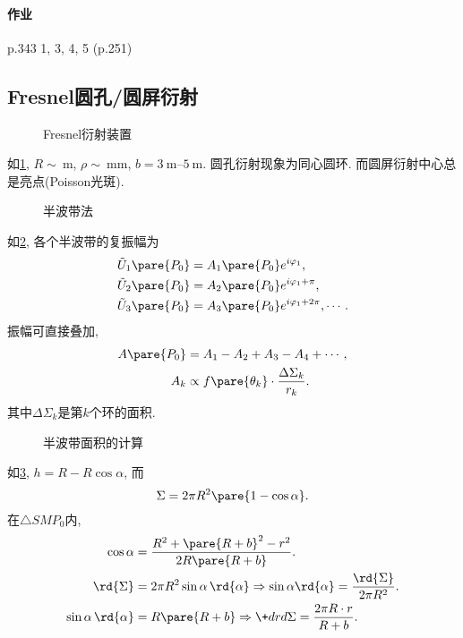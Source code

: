 \documentclass{ctexart}
\begin{document}
\paragraph{作业} %
\label{par:作业}

p.343 1, 3, 4, 5 (p.251)



\subsection{Fresnel圆孔/圆屏衍射} %
\label{sub:fresnel圆孔_圆屏衍射}

\begin{figure}[ht]
    \centering
    \caption{Fresnel衍射装置}
    \label{fig:Fresnel衍射装置}
\end{figure}
如\cref{fig:Fresnel衍射装置}, $R\sim \SI{}{\meter}$, $\rho\sim \SI{}{\milli\meter}$, $b=\SI{3}{\meter}$--$\SI{5}{\meter}$. 圆孔衍射现象为同心圆环. 而圆屏衍射中心总是亮点(Poisson光斑).
\begin{figure}[ht]
    \centering
    \caption{半波带法}
    \label{fig:半波带法}
\end{figure}
如\cref{fig:半波带法}, 各个半波带的复振幅为
\begin{align*}
    \tilde{U}_1\pare{P_0} &= A_1\pare{P_0} e^{i\varphi_1}, \\
    \tilde{U}_2\pare{P_0} &= A_2\pare{P_0} e^{i\varphi_1 + \pi}, \\
    \tilde{U}_3\pare{P_0} &= A_3\pare{P_0} e^{i\varphi_1 + 2\pi}, \cdots.
\end{align*}
振幅可直接叠加,
\begin{align*}
    A\pare{P_0} &= A_1 - A_2 + A_3 - A_4 + \cdots, \\
    A_k &\propto f\pare{\theta_k} \cdot \frac{\Delta \Sigma_k}{r_k}.
\end{align*}
其中$\Delta \Sigma_k$是第$k$个环的面积.
\begin{figure}
    \centering
    \caption{半波带面积的计算}
    \label{fig:半波带面积的计算}
\end{figure}
如\cref{fig:半波带面积的计算}, $h = R - R\cos \alpha$, 而
\[ \Sigma = 2\pi R^2 \pare{1-\cos \alpha}. \]
在$\bigtriangleup SMP_0$内,
\begin{align*}
    \cos\alpha &= \frac{R^2 + \pare{R+b}^2 - r^2}{2R\pare{R+b}}. \\
    \rd{\Sigma} &= 2\pi R^2 \sin\alpha\,\rd{\alpha} \Rightarrow \sin\alpha\rd{\alpha} = \frac{\rd{\Sigma}}{2\pi R^2}. \\
    \sin\alpha\,\rd{\alpha} &= R\pare{R+b} \Rightarrow \+drd\Sigma = \frac{2\pi R\cdot r}{R+b}.
\end{align*}
\end{document}
